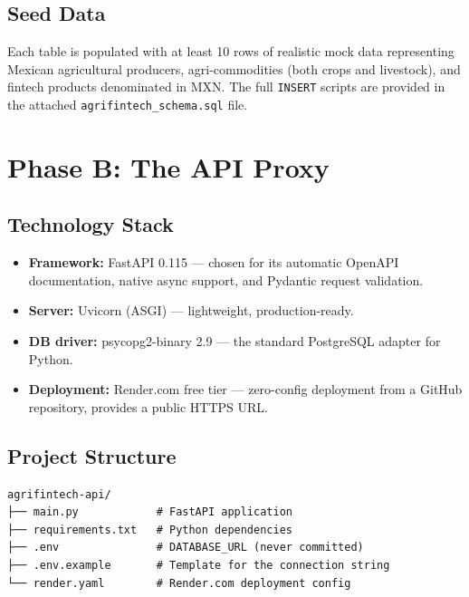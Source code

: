 \documentclass[12pt, a4paper]{article}
\begin{document}
\subsection{Seed Data}

Each table is populated with at least 10 rows of realistic mock data representing
Mexican agricultural producers, agri-commodities (both crops and livestock), and
fintech products denominated in MXN. The full \texttt{INSERT} scripts are provided
in the attached \texttt{agrifintech\_schema.sql} file.

\section{Phase B: The API Proxy}

\subsection{Technology Stack}

\begin{itemize}[leftmargin=1.5em]
  \item \textbf{Framework:} FastAPI 0.115 — chosen for its automatic OpenAPI
        documentation, native async support, and Pydantic request validation.
  \item \textbf{Server:} Uvicorn (ASGI) — lightweight, production-ready.
  \item \textbf{DB driver:} psycopg2-binary 2.9 — the standard PostgreSQL adapter
        for Python.
  \item \textbf{Deployment:} Render.com free tier — zero-config deployment from a
        GitHub repository, provides a public HTTPS URL.
\end{itemize}

\subsection{Project Structure}

\begin{lstlisting}[style=bashstyle, caption={Project file structure}]
agrifintech-api/
├── main.py            # FastAPI application
├── requirements.txt   # Python dependencies
├── .env               # DATABASE_URL (never committed)
├── .env.example       # Template for the connection string
└── render.yaml        # Render.com deployment config
\end{lstlisting}
\end{document}
